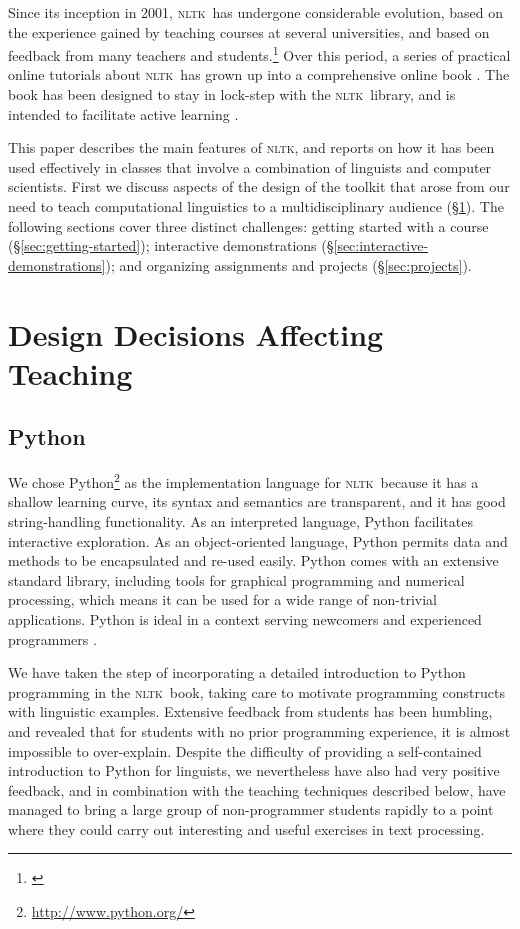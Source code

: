 \documentclass[11pt]{article}
\newcommand{\NLTK}{\textsc{nltk}}
\begin{document}
Since its inception in 2001, \NLTK\ has undergone considerable
evolution, based on the experience gained by teaching courses at
several universities, and based on feedback from many teachers and
students.\footnote{\cite{BirdLoper04,Loper04,Bird05icon,Hearst05,Bird06nltk,Klein06altw,Liddy05,Madnani07,MadnaniDorr08,BaldridgeErk08}}
Over this period, a series of practical online tutorials
about \NLTK\ has grown up into a comprehensive online book \cite{BirdKleinLoper08}.
The book has been designed to stay in lock-step
with the \NLTK\ library, and is intended to facilitate
active learning \cite{BonwellEison91}.

This paper describes the main features of \NLTK, and reports on how it has
been used effectively in classes that involve a combination of
linguists and computer scientists.  First we discuss aspects of the
design of the toolkit that arose from our need to teach computational
linguistics to a multidisciplinary audience (\S\ref{sec:design}).
The following sections cover three distinct challenges:
getting started with a course (\S\ref{sec:getting-started});
interactive demonstrations (\S\ref{sec:interactive-demonstrations});
and organizing assignments and projects (\S\ref{sec:projects}).

\section{Design Decisions Affecting Teaching}
\label{sec:design}

\subsection{Python}

We chose Python\footnote{\url{http://www.python.org/}} as the
implementation language for \NLTK\ because it has a shallow learning
curve, its syntax and semantics are transparent, and it has good
string-handling functionality.  As an interpreted language, Python
facilitates interactive exploration.  As an object-oriented language,
Python permits data and methods to be encapsulated and re-used easily.
Python comes with an extensive standard library, including tools for
graphical programming and numerical processing, which means it can be
used for a wide range of non-trivial applications.  Python is ideal in
a context serving newcomers and experienced programmers
\cite{Shannon03}.

We have taken the step of incorporating a detailed introduction to
Python programming in the \NLTK\ book, taking care to motivate
programming constructs with linguistic examples. Extensive feedback
from students has been humbling, and revealed that for students with
no prior programming experience, it is almost impossible to
over-explain. Despite the difficulty of providing a
self-contained introduction to Python for linguists, we nevertheless
have also had very positive feedback, and in combination with the
teaching techniques described below, have managed to bring a
large group of non-programmer students rapidly to a point where they
could carry out interesting and useful exercises in text processing.
\end{document}
